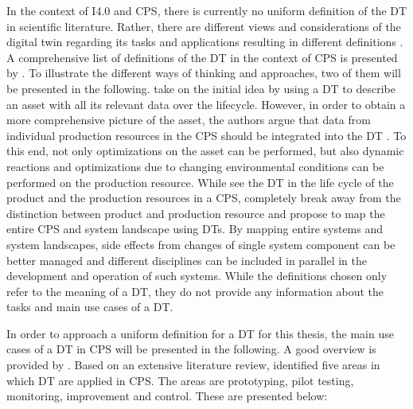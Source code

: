 In the context of \ac{I4.0} and \ac{CPS}, there is currently no uniform definition of the \ac{DT} in scientific literature. Rather, there are different views and considerations of the digital twin regarding its tasks and applications resulting in different definitions \cite[p. 4]{Deuter2019TheTheory}. A comprehensive list of definitions of the \ac{DT} in the context of \ac{CPS} is presented by \citet[p. 941]{Negri2017ASystems}. To illustrate the different ways of thinking and approaches, two of them will be presented in the following. \citet[p. 567]{Rosen2015AboutManufacturing} take on the initial idea by using a \ac{DT} to describe an asset with all its relevant data over the lifecycle. However, in order to obtain a more comprehensive picture of the asset, the authors argue that data from individual production resources in the \ac{CPS} should be integrated into the \ac{DT} \cite[p. 569]{Rosen2015AboutManufacturing}. To this end, not only optimizations on the asset can be performed, but also dynamic reactions and optimizations due to changing environmental conditions can be performed on the production resource. While \citeauthor{Rosen2015AboutManufacturing} see the \ac{DT} in the life cycle of the product and the production resources in a \ac{CPS}, \citet[p. 3]{Schluse2016FromSystems} completely break away from the distinction between product and production resource and propose to map the entire \ac{CPS} and system landscape using \ac{DT}s. By mapping entire systems and system landscapes, side effects from changes of single system component can be better managed and different disciplines can be included in parallel in the development and operation \cite[p. 2]{Schluse2016FromSystems} of such systems. While the definitions chosen only refer to the meaning of a \ac{DT}, they do not provide any information about the tasks and main use cases of a \ac{DT}. 

In order to approach a uniform definition for a \ac{DT} for this thesis, the main use cases of a \ac{DT} in \ac{CPS} will be presented in the following. A good overview is provided by \citet{Son2021PastManufacturing}. Based on an extensive literature review, \citet{Son2021PastManufacturing} identified five areas in which \ac{DT} are applied in \ac{CPS}. The areas are prototyping, pilot testing, monitoring, improvement and control. These are presented below:

